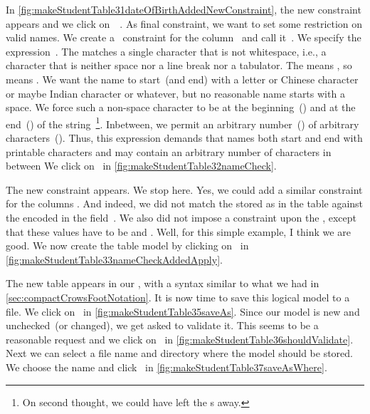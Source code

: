 In \cref{fig:makeStudentTable31dateOfBirthAddedNewConstraint}, the new constraint appears and we click on~~\pgmodelerAddItem.
As final constraint, we want to set some restriction on valid names.
We create a ~constraint for the column~ and call it~.
We specify the expression~\expandafter{}.
The \textil{\\S} matches a single character that is not whitespace, i.e., a character that is neither space nor a line break nor a tabulator.
The \textil{+} means , so \textil{\\S+} means .
We want the name to start~(and end) with a letter or Chinese character or maybe Indian character or whatever, but no reasonable name starts with a space.
We force such a non-space character to be at the beginning~(\textil{^\\S+}) and at the end~(\textil{\\S+\$}) of the string~\footnote{%
On second thought, we could have left the \textil{+}s away.%
}. %
Inbetween, we permit an arbitrary number~(\textil{*}) of arbitrary characters~().
Thus, this expression  demands that names both start and end with printable characters and may contain an arbitrary number of characters in between
We click on~ in \cref{fig:makeStudentTable32nameCheck}.

The new constraint appears.
We stop here.
Yes, we could add a similar constraint for the columns .
And indeed, we did not match the  stored as  in the table against the  encoded in the field~.
We also did not impose a constraint upon the , except that these values have to be  and .
Well, for this simple example, I think we are good.
We now create the table model by clicking on~ in \cref{fig:makeStudentTable33nameCheckAddedApply}.

The new table appears in our , with a syntax similar to what we had in \cref{sec:compactCrowsFootNotation}.
It is now time to save this logical model to a file.
We click on~ in \cref{fig:makeStudentTable35saveAs}.
Since our model is new and unchecked~(or changed), we get asked to validate it.
This seems to be a reasonable request and we click on~ in \cref{fig:makeStudentTable36shouldValidate}.
Next we can select a file name and directory where the model should be stored.
We choose the name  and click~ in \cref{fig:makeStudentTable37saveAsWhere}.

